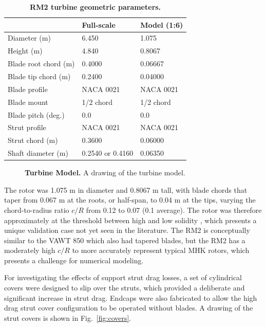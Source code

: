 \documentclass[10pt,letterpaper]{article}
\begin{document}
\begin{table}[ht]
\centering
\begin{tabular}{l|l|l}
   & Full-scale & Model (1:6) \\
\hline
Diameter (m)   & 6.450 & 1.075 \\
Height (m)     & 4.840 & 0.8067 \\
Blade root chord (m) & 0.4000 & 0.06667 \\
Blade tip chord (m)  & 0.2400 & 0.04000 \\
Blade profile & NACA 0021 & NACA 0021 \\
Blade mount & 1/2 chord & 1/2 chord \\
Blade pitch (deg.) & 0.0 & 0.0 \\
Strut profile & NACA 0021 & NACA 0021 \\
Strut chord (m) & 0.3600 & 0.06000 \\
Shaft diameter (m) & 0.2540 \cite{Beam2011} or 0.4160 \cite{Hill2014} & 0.06350\\
\end{tabular}
\caption{\textbf{RM2 turbine geometric parameters.}}
\label{tab:turb-geom}
\end{table}

\begin{figure}[h]

    \caption{{\bf Turbine Model.} A drawing of the turbine model.}

    \label{fig:turbine-drawing}
\end{figure}

The rotor was 1.075 m in diameter and 0.8067 m tall, with blade chords that
taper from 0.067 m at the roots, or half-span, to 0.04 m at the tips, varying
the chord-to-radius ratio $c/R$ from 0.12 to 0.07 (0.1 average). The rotor was
therefore approximately at the threshold between high and low solidity
\cite{Strickland1981,Fiedler2009}, which presents a unique validation case not
yet seen in the literature. The RM2 is conceptually similar to the VAWT 850
\cite{Mays1990} which also had tapered blades, but the RM2 has a moderately high
$c/R$ to more accurately represent typical MHK rotors, which presents a
challenge for numerical modeling.

For investigating the effects of support strut drag losses, a set of cylindrical
covers were designed to slip over the struts, which provided a deliberate and
significant increase in strut drag. Endcaps were also fabricated to allow the
high drag strut cover configuration to be operated without blades. A drawing of
the strut covers is shown in Fig.~\ref{fig:covers}.
\end{document}
